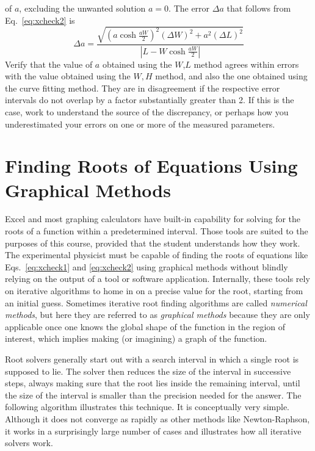 \documentclass{revtex4}
\begin{document}
of $a$, excluding the unwanted solution $a=0$. The error $\Delta a$
that follows from Eq.~\ref{eq:xcheck2} is
\begin{equation}
\Delta a = \frac{\sqrt{\left(a\cosh{\frac{aW}{2}}\right)^2
(\Delta W)^2 +a^2(\Delta L)^2}}{\left| L-W\cosh{\frac{aW}{2}}\right|}
\label{eq:xcheck2err}
\end{equation}
Verify that the value of $a$ obtained using the $W$,$L$ method agrees
within errors with the value obtained using the $W,H$ method, and also
the one obtained using the curve fitting method. They are in disagreement
if the respective error intervals do not overlap by a factor substantially
greater than 2. If this is the case, work to understand the source of the
discrepancy, or perhaps how you underestimated your errors on one or 
more of the measured parameters.

\section{Finding Roots of Equations Using Graphical Methods}

Excel and most graphing calculators have built-in capability for solving
for the roots of a function within a predetermined interval. Those tools
are suited to the purposes of this course, provided that the student
understands how they work. The experimental physicist must be capable of
finding the roots of equations like Eqs.~\ref{eq:xcheck1} and \ref{eq:xcheck2}
using graphical methods without blindly relying on the output of a tool or
software application.  Internally, these tools rely on iterative algorithms
to home in on a precise value for the root, starting from an initial guess.
Sometimes iterative root finding algorithms are called {\em numerical methods},
but here they are referred to as {\em graphical methods} because they are
only applicable once one knows the global shape of the function in the region
of interest, which implies making (or imagining) a graph of the function.

Root solvers generally start out with a search interval in which a single
root is supposed to lie. The solver then reduces the size of the interval
in successive steps, always making sure that the root lies inside the
remaining interval, until the size of the interval is smaller than the
precision needed for the answer. The following algorithm illustrates this
technique.  It is conceptually very simple. Although it does not converge
as rapidly as other methods like Newton-Raphson, it works in a surprisingly
large number of cases and illustrates how all iterative solvers work.
\end{document}
